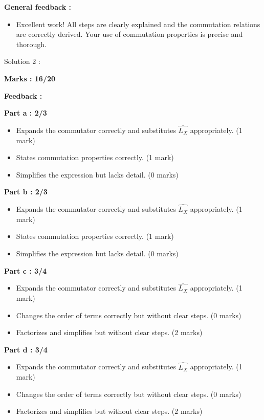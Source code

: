 \documentclass[a4paper,11pt]{article}
\begin{document}
\textbf{General feedback :}

\begin{itemize}
    \item Excellent work! All steps are clearly explained and the commutation relations are correctly derived. Your use of commutation properties is precise and thorough.
\end{itemize}



Solution 2 :

\textbf{Marks : 16/20}

\textbf{Feedback :}

\textbf{Part a : 2/3}

\begin{itemize}
    \item Expands the commutator correctly and substitutes $\hat{L_X}$ appropriately. (1 mark)
    \item States commutation properties correctly. (1 mark)
    \item Simplifies the expression but lacks detail. (0 marks)
\end{itemize}


\textbf{Part b : 2/3}

\begin{itemize}
    \item Expands the commutator correctly and substitutes $\hat{L_X}$ appropriately. (1 mark)
    \item States commutation properties correctly. (1 mark)
    \item Simplifies the expression but lacks detail. (0 marks)
\end{itemize}


\textbf{Part c : 3/4}

\begin{itemize}
    \item Expands the commutator correctly and substitutes $\hat{L_X}$ appropriately. (1 mark)
    \item Changes the order of terms correctly but without clear steps. (0 marks)
    \item Factorizes and simplifies but without clear steps. (2 marks)
\end{itemize}


\textbf{Part d : 3/4}

\begin{itemize}
    \item Expands the commutator correctly and substitutes $\hat{L_X}$ appropriately. (1 mark)
    \item Changes the order of terms correctly but without clear steps. (0 marks)
    \item Factorizes and simplifies but without clear steps. (2 marks)
\end{itemize}
\end{document}
